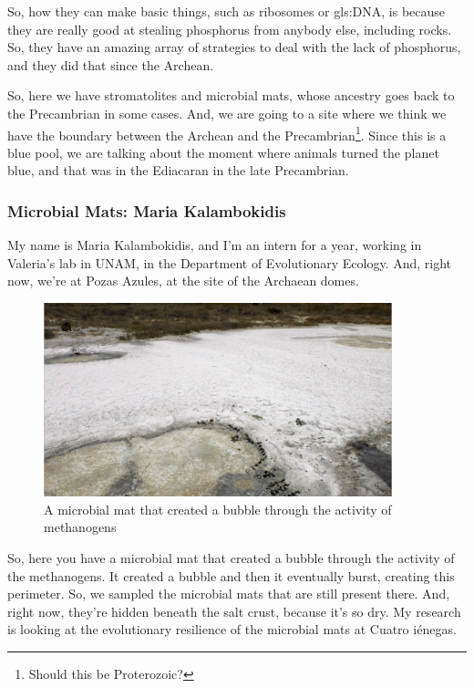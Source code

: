 \documentclass[]{article}
\begin{document}
So, how they can make basic things, such as ribosomes or \gls{gls:DNA}, is because they are really good at stealing phosphorus from anybody else, including rocks. So, they have an amazing array of strategies to deal with the lack of phosphorus, and they did that since the Archean.

So, here we have stromatolites and microbial mats, whose ancestry goes back
to the Precambrian in some cases. And, we are going to a site where we think we have the boundary between the Archean and the Precambrian\footnote{Should this be Proterozoic?}. Since this is a blue pool, we are talking about the moment where animals turned the planet blue, and that was in the Ediacaran in the late Precambrian.

\subsubsection{Microbial Mats: Maria Kalambokidis}
My name is Maria Kalambokidis, and I'm an intern for a year, working in Valeria's lab in UNAM, in the Department of Evolutionary Ecology. And, right now, we're at Pozas Azules, at the site of the Archaean domes. 

\begin{figure}[H]
	\caption[A microbial mat showing the activity of  methanogens]{A microbial mat that created a bubble through the activity of  methanogens} 
	\includegraphics[width=0.9\textwidth]{CuatroCienegas3}
\end{figure}

So, here you have a microbial mat that created a bubble through the activity of the methanogens. It created a bubble and then it eventually burst, creating this perimeter. So, we sampled the microbial mats that are still present there. And, right now, they're hidden beneath the salt crust, because it's so dry. My research is looking at the evolutionary resilience of the microbial mats at Cuatro i\'enegas.
\end{document}

